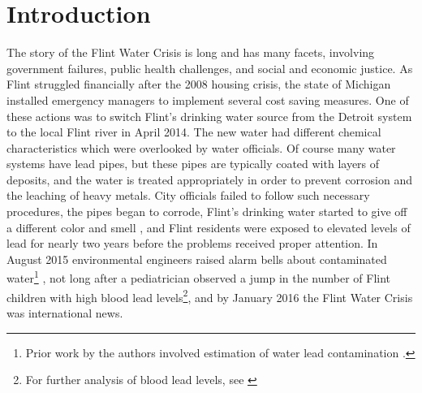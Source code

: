 \documentclass[sigconf]{acmart}
\begin{document}





\maketitle



\newpage

\linespread{1.5}

\section{Introduction}


The story of the Flint Water Crisis is long and has many facets, involving government failures, public health challenges, and social and economic justice. As Flint struggled financially after the 2008 housing crisis, the state of Michigan installed emergency managers to implement several cost saving measures. One of these actions was to switch Flint's drinking water source from the Detroit system to the local Flint river in April 2014. The new water had different chemical characteristics which were overlooked by water officials. Of course many water systems have lead pipes, but these pipes are typically coated with layers of deposits, and the water is treated appropriately in order to prevent corrosion and the leaching of heavy metals.
City officials failed to follow such necessary procedures, the pipes began to corrode, Flint's drinking water started to give off a different color and smell \cite{Mlive-toxicleadgetsintoFlintwater:url}, and Flint residents were exposed to elevated levels of lead for nearly two years before the problems received proper attention. In August 2015 environmental engineers raised alarm bells about contaminated water\footnote{Prior work by the authors involved estimation of water lead contamination \cite{abernethy2016flint}.} \cite{torrice2016lead}, not long after a pediatrician observed a jump in the number of Flint children with high blood lead levels\footnote{For further analysis of blood lead levels, see \cite{potash2015predictive}}\cite{hanna2016elevated}, and by January 2016 the Flint Water Crisis was international news.
\end{document}
